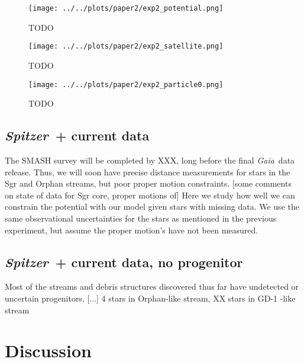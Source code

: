 \documentclass[letterpaper,12pt,preprint]{aastex}
\newcommand{\project}[1]{\textsl{#1}}
\newcommand{\gaia}{\project{Gaia}}
\newcommand{\spitzer}{\project{Spitzer}~}
\begin{document}
\begin{figure}[!ht]
\begin{center}
\texttt{[image: ../../plots/paper2/exp2\_potential.png]}
\caption{ TODO  }\label{fig:exp2_potential}
\end{center}
\end{figure}

\begin{figure}[!ht]
\begin{center}
\texttt{[image: ../../plots/paper2/exp2\_satellite.png]}
\caption{ TODO  }\label{fig:exp2_satellite}
\end{center}
\end{figure}

\begin{figure}[!ht]
\begin{center}
\texttt{[image: ../../plots/paper2/exp2\_particle0.png]}
\caption{ TODO  }\label{fig:exp2_particle0}
\end{center}
\end{figure}

\subsection{\spitzer + current data}
The SMASH survey \citep{smashprop} will be completed by XXX, long before the final \gaia\, data release. Thus, we will soon have precise distance measurements for stars in the Sgr and Orphan streams, but poor proper motion constraints. [some comments on state of data for Sgr core, proper motions of] Here we study how well we can constrain the potential with our model given stars with missing data. We use the same observational uncertainties for the stars as mentioned in the previous experiment, but assume the proper motion's have not been measured. 

\subsection{\spitzer + current data, no progenitor}
Most of the streams and debris structures discovered thus far have undetected or uncertain progenitors. [...]
4 stars in Orphan-like stream, XX stars in GD-1 -like stream


\section{Discussion}
\end{document}
